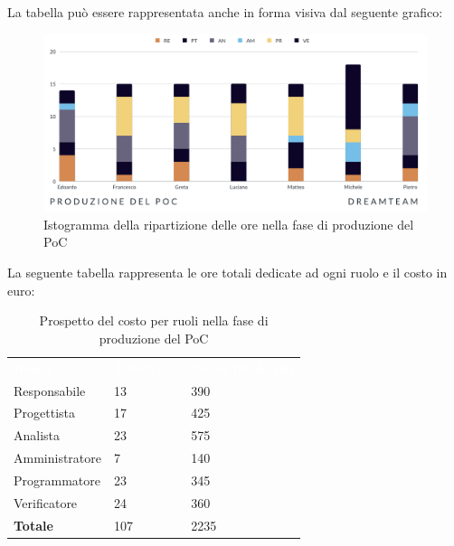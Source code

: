 La tabella può essere rappresentata anche in forma visiva dal seguente grafico:
\begin{figure}[!h]
\centering
\includegraphics[scale=0.65]{Sezioni/SezioniPreventivo/grafici/Poc.png}
\caption{Istogramma della ripartizione delle ore nella fase di produzione del PoC}
\end{figure}

La seguente tabella rappresenta le ore totali dedicate ad ogni ruolo e il costo in euro:

\begin{table}[!htbp]
\begin{center}
\renewcommand{\arraystretch}{1.5}
\begin{tabular}{ m{}<{\centering}  m{}<{\centering} m{}<{\centering}}
	\rowcolor{darkblue}
	\textcolor{white}{\textbf{Ruolo}}&\textcolor{white}{\textbf{Totale ore}}&\textcolor{white}{\textbf{Costo totale (\euro)}}\\ 

	Responsabile  & 13 & 390\\	
	
	Progettista & 17 & 425\\
	
	Analista & 23 & 575 \\

	Amministratore & 7 & 140\\
	
	Programmatore & 23 & 345 \\
	
	Verificatore & 24 & 360 \\
	
	\textbf{Totale} & 107 & 2235 \\
	
\end{tabular}
\caption{Prospetto del costo per ruoli nella fase di produzione del PoC}
\end{center}
\end{table}

